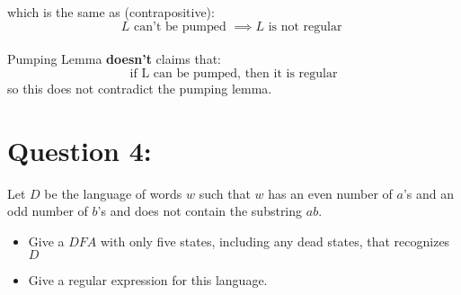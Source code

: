\documentclass [9 pt]{article}
\theoremstyle{definition}
\begin{document}
which is the same as (contrapositive):
$$ L \text{ can't be pumped }\implies L \text{ is not regular } $$\\
\newline
Pumping Lemma \textbf{ doesn't  } claims that:
$$\text{ if  L can be pumped, then it is regular }$$
so this does not contradict the pumping lemma.\\

























\newpage
\section*{Question 4:}
Let $D$ be the language of words $w$ such that $w$ has an even number of $a$’s and an odd number of $b$’s and does not contain the substring $ab$.
\begin{itemize}
	\item Give a $DFA$ with only five states, including any dead states, that recognizes $D$
	\item Give a regular expression for this language.
\end{itemize}
\end{document}
